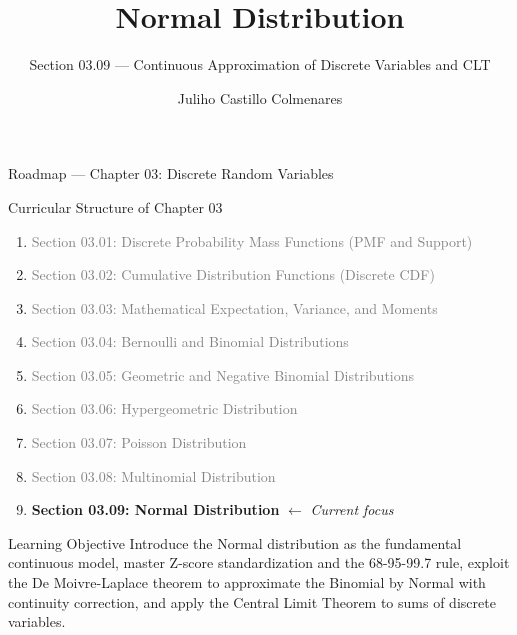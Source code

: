 \documentclass[aspectratio=169,xcolor={dvipsnames,table}]{beamer}
\title{Normal Distribution}
\subtitle{Section 03.09 --- Continuous Approximation of Discrete Variables and CLT}
\author[J. Castillo Colmenares]{Juliho Castillo Colmenares}
\institute[Tec de Monterrey]{Tecnologico de Monterrey}
\date{\vspace{-1.5cm}}
\begin{document}
\begin{frame}[plain]
	\titlepage
\end{frame}

\begin{frame}{Roadmap --- Chapter 03: Discrete Random Variables}
	\vspace{-0.15cm}
	\begin{block}{Curricular Structure of Chapter 03}
		\footnotesize
		\begin{enumerate}\itemsep=0.01cm
			\item \textcolor{gray}{Section 03.01: Discrete Probability Mass Functions (PMF and Support)}
			\item \textcolor{gray}{Section 03.02: Cumulative Distribution Functions (Discrete CDF)}
			\item \textcolor{gray}{Section 03.03: Mathematical Expectation, Variance, and Moments}
			\item \textcolor{gray}{Section 03.04: Bernoulli and Binomial Distributions}
			\item \textcolor{gray}{Section 03.05: Geometric and Negative Binomial Distributions}
			\item \textcolor{gray}{Section 03.06: Hypergeometric Distribution}
			\item \textcolor{gray}{Section 03.07: Poisson Distribution}
			\item \textcolor{gray}{Section 03.08: Multinomial Distribution}
			\item \textbf{\textcolor{TecRojo}{Section 03.09: Normal Distribution}} $\leftarrow$ \emph{Current focus}
		\end{enumerate}
	\end{block}
	\vspace{-0.25cm}
	\begin{alertblock}{Learning Objective}
		\scriptsize
		Introduce the Normal distribution as the fundamental continuous model, master Z-score standardization and the 68-95-99.7 rule, exploit the De Moivre-Laplace theorem to approximate the Binomial by Normal with continuity correction, and apply the Central Limit Theorem to sums of discrete variables.
	\end{alertblock}
\end{frame}
\end{document}
